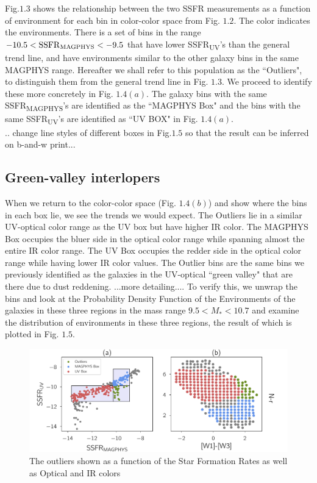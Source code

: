 Fig.$1.3$ shows the relationship between the two SSFR measurements as a function of environment for each bin in color-color space from Fig. $1.2$. The color indicates the environments. There is a set of bins in the range $ -10.5 < \mathrm{SSFR\textsubscript{MAGPHYS}}< -9.5$ that have lower SSFR\textsubscript{UV}'s than the general trend line, and have environments similar to the other galaxy bins in the same MAGPHYS range. Hereafter we shall refer to this population as the ``Outliers", to distinguish them from the general trend line in Fig. $1.3$. We proceed to identify these more concretely in Fig. $1.4(a)$. The galaxy bins with the same SSFR\textsubscript{MAGPHYS}'s are identified as the ``MAGPHYS Box" and the bins with the  same SSFR\textsubscript{UV}'s are identified as ``UV BOX" in Fig. $1.4(a)$. \\
.. change line styles of different boxes in Fig.$1.5$ so that the result can be inferred on b-and-w print...
  
\subsection{Green-valley interlopers}
When we return to the color-color space (Fig. $1.4(b)$) and show where the bins in each box lie, we see the trends we would expect. The Outliers  lie in a similar UV-optical color range as the UV box but have higher IR color. The MAGPHYS Box occupies the bluer side in the optical color range while spanning almost the entire IR color range. The UV Box occupies the redder side in the optical color range while having lower IR color values. The Outlier bins are the same bins we previously identified as the galaxies in the UV-optical ``green valley" that are there due to dust reddening. ...more detailing.... To verify this, we unwrap the bins and look at the Probability Density Function of the Environments of the galaxies in these three regions in the mass range  $ 9.5 < M_{*} < 10.7$ and examine the distribution of environments in these three regions, the result of which is plotted in Fig. $1.5$.

\begin{figure}
\includegraphics[width=\textwidth]{figures/3_outliers.pdf}
\caption[Short figure name.]{The outliers shown as a function of the Star Formation Rates as well as Optical and IR colors
\label{fig:myInlineFigure}}
\end{figure}
 
